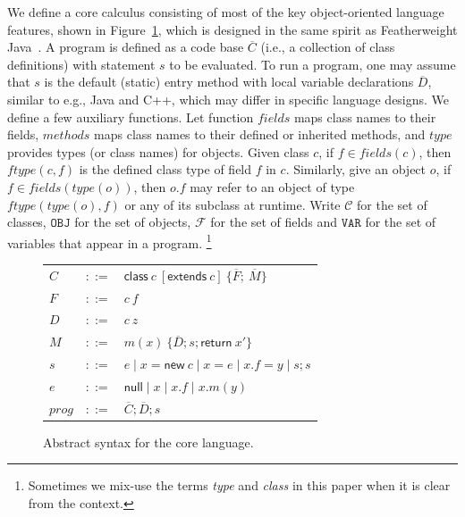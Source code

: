 \documentclass{fac}
\newcommand{\keyword}[1]{\mathsf{#1}}
\newcommand{\kw}[1]{\keyword{#1}}
\newcommand{\kwnull}[0]{\keyword{null}}
\newcommand{\kwnew}[0]{\keyword{new}}
\newcommand{\kwextends}[0]{\keyword{extends}}
\newcommand{\kwclass}[0]{\keyword{class}}
\newcommand\Var{\mathtt{VAR}}
\newcommand\Val{\mathtt{V}}
\newcommand\Obj{\mathtt{OBJ}}
\newcommand{\Class}{\mathcal{C}}
\newcommand{\Field}{\mathcal{F}}
\newcommand\set[1]{\{#1\}}
\begin{document}
We define a core calculus consisting of most of the key object-oriented language features, shown in Figure~\ref{fig:syntax}, which is designed in the same spirit as Featherweight Java~\cite{Igarashi2001}.
A program is defined as a code base $\overline{C}$ (i.e., a collection of class definitions) with statement $s$ to be evaluated.
To run a program, one may assume that $s$ is the default (static) entry method with local variable declarations $\overline{D}$,
similar to e.g., Java and C++, which may differ in specific language designs.
We define a few auxiliary functions. Let function $fields$ maps class names to their fields, $methods$ maps class names to their defined or inherited methods, and $type$ provides types (or class names) for objects. Given class $c$, if $f\in fields(c)$, then $ftype(c,f)$ is the defined class type of field $f$ in $c$. Similarly, give an object $o$, if $f\in fields(type(o))$, then $o.f$ may refer to an object of type $ftype(type(o),f)$ or %
any of its subclass at runtime. Write $\Class$ for the set of classes, $\Obj$ for the set of objects, $\Field$ for the set of fields and $\Var$ for the set of variables that appear in a program.
\footnote{Sometimes we mix-use the terms \emph{type} and \emph{class} in this paper when it is clear from the context.}

\begin{figure}\centering
	\begin{tabular}[c]{lll}
		$C$&$::=$&$\kwclass\ c\ [\kwextends\ c] \ \{\overline{F};\ \overline{M}\}$\\
        $F$&$::=$&$c \ f$\\
        $D$&$::=$&$c \ z$\\
		$M$&$::=$&$m(x) \ \{\overline{D}; s; \kw{return}\ x'\}$\\
		$s$&$::=$&$e\mid x{=}\kwnew \ c\mid  x {=} e \mid x.f{=}y \mid s;s$\\

		$e$&$::=$&$ \kwnull\mid x \mid x.f \mid x.m(y) $\\
        $prog$&$::=$&$\overline{C};\overline{D}; s$\\
	\end{tabular}
	\caption{Abstract syntax for the core language. \label{fig:syntax}}
\end{figure}
\end{document}
